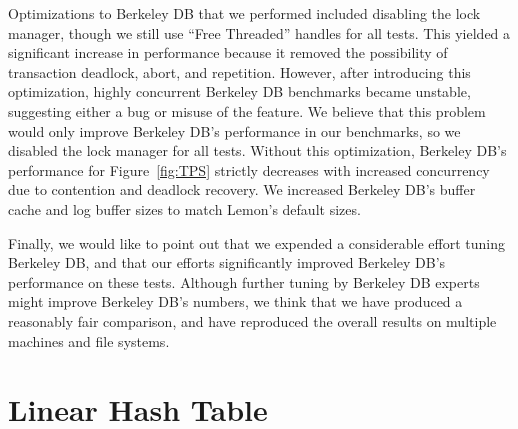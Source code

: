 \documentclass[10pt,letterpaper,twocolumn,english]{article}
\newcommand{\yad}{Lemon\xspace}
\begin{document}
Optimizations to Berkeley DB that we performed included disabling the
lock manager, though we still use ``Free Threaded'' handles for all
tests.  This yielded a significant increase in performance because it
removed the possibility of transaction deadlock, abort, and repetition.
However, after introducing this optimization, highly concurrent
Berkeley DB benchmarks became unstable, suggesting either a bug or
misuse of the feature.  We believe that this problem would only
improve Berkeley DB's performance in our benchmarks, so we disabled
the lock manager for all tests.  Without this optimization, Berkeley
DB's performance for Figure~\ref{fig:TPS} strictly decreases with increased concurrency due to contention and deadlock recovery.
We increased Berkeley DB's buffer cache and log buffer sizes to match
\yad's default sizes.

Finally, we would like to point out that we expended a considerable
effort tuning Berkeley DB, and that our efforts significantly improved
Berkeley DB's performance on these tests.  Although further tuning by
Berkeley DB experts might improve Berkeley DB's numbers, we think that
we have produced a reasonably fair comparison, and have reproduced the
overall results on multiple machines and file systems.


\section{Linear Hash Table\label{sub:Linear-Hash-Table}}



%
\end{document}
